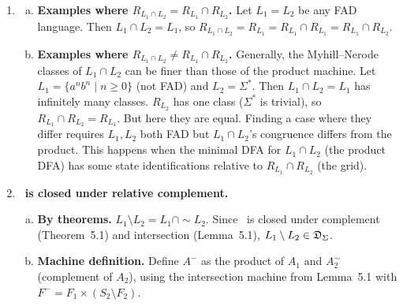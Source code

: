 \begin{enumerate}[{5.}1. ]
The right congruence $\equiv_L$ on $\Sigma^*$ is defined by $x\equiv_L y$ iff $\forall z\in\Sigma^*,xz\in L\Leftrightarrow yz\in L$.  The right congruence $\equiv_{\sim L}$ satisfies $x\equiv_{\sim L}y$ iff $\forall z,xz\in\sim L\Leftrightarrow yz\in\sim L$, i.e., $xz\notin L\Leftrightarrow yz\notin L$, i.e., $xz\in L\Leftrightarrow yz\in L$.  So $\equiv_L=\equiv_{\sim L}$: the two right congruences are identical.

This makes sense: if $A$ is a minimal DFA for $L$, then $A^\sim$ (with complemented final states) is a minimal DFA for $\sim L$, and both have the same state set and transition function.  Thus $R_L=R_{\sim L}$.

\item \begin{enumerate}[(a)]
  \item \textbf{Examples where $R_{L_1\cap L_2}=R_{L_1}\cap R_{L_2}$.}
  Let $L_1=L_2$ be any FAD language.  Then $L_1\cap L_2=L_1$, so $R_{L_1\cap L_2}=R_{L_1}=R_{L_1}\cap R_{L_1}=R_{L_1}\cap R_{L_2}$.

  \item \textbf{Examples where $R_{L_1\cap L_2}\neq R_{L_1}\cap R_{L_2}$.}
  Generally, the Myhill--Nerode classes of $L_1\cap L_2$ can be finer than those of the product machine.  Let $L_1=\{a^nb^n\mid n\ge 0\}$ (not FAD) and $L_2=\Sigma^*$.  Then $L_1\cap L_2=L_1$ has infinitely many classes.  $R_{L_2}$ has one class ($\Sigma^*$ is trivial), so $R_{L_1}\cap R_{L_2}=R_{L_1}$.  But here they are equal.  Finding a case where they differ requires $L_1,L_2$ both FAD but $L_1\cap L_2$'s congruence differs from the product.  This happens when the minimal DFA for $L_1\cap L_2$ (the product DFA) has some state identifications relative to $R_{L_1}\cap R_{L_2}$ (the grid).
\end{enumerate}

\item \textbf{\DSIG\ is closed under relative complement.}

\begin{enumerate}[(a)]
  \item \textbf{By theorems.}  $L_1\setminus L_2=L_1\cap\sim L_2$.  Since \DSIG\ is closed under complement (Theorem~5.1) and intersection (Lemma~5.1), $L_1\setminus L_2\in\mathfrak{D}_\Sigma$.

  \item \textbf{Machine definition.}  Define $A^-$ as the product of $A_1$ and $A_2^\sim$ (complement of $A_2$), using the intersection machine from Lemma~5.1 with $F^-=F_1\times(S_2\setminus F_2)$.


\end{enumerate}
\end{enumerate}
